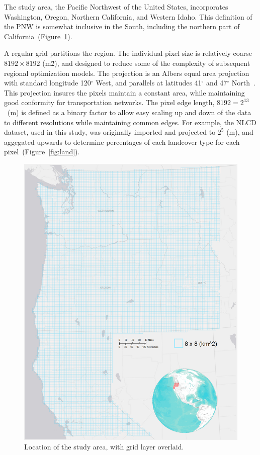 \documentclass[preprint,12pt]{elsarticle}
\newcommand{\degree}{\ensuremath{{}^{\circ}}\xspace}
\begin{document}
The study area, the Pacific Northwest of the United States,
incorporates Washington, Oregon, Northern California, and Western
Idaho.  This definition of the \acs{PNW} is somewhat inclusive in the
South, including the northern part of California~(Figure~\ref{fig:grid}).

A regular grid partitions the region.  The individual pixel size is
relatively coarse $8192 \times 8192$ (m\^2), and designed to reduce
some of the complexity of subsequent regional optimization models.
The projection is an Albers equal area projection with standard
longitude 120\degree West, and parallels at latitudes 41\degree and
47\degree North~\cite{Butler}. This projection insures the pixels
maintain a constant area, while maintaining good conformity for
transportation networks.  The pixel edge length, $8192 = 2^{13}$~(m)
is defined as a binary factor to allow easy scaling up and down of the
data to different resolutions while maintaining common edges.  For
example, the \ac{NLCD} dataset, used in this study, was originally
imported and projected to $2^5$ (m), and aggegated upwards to
determine percentages of each landcover type for each
pixel~(Figure~\ref{fig:land}).

\begin{figure}[hp]
  \centering
  \includegraphics[width=1.0\linewidth]{grid}
  \caption{Location of the study area, with grid layer overlaid.}
  \label{fig:grid}
\end{figure}
\end{document}
